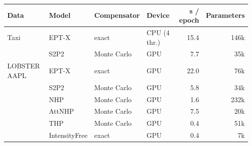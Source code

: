 \begin{tabular}{llllrr}
\toprule
Data & Model & Compensator & Device & s / epoch & Parameters \\
\midrule
\rowcolor{oursbg} Taxi & EPT-X & exact & CPU (4 thr.) & 15.4 & 146k \\
 & S2P2 & Monte Carlo & GPU & 7.7 & 35k \\
\midrule
\rowcolor{oursbg} LOBSTER AAPL & EPT-X & exact & GPU & 22.0 & 76k \\
 & S2P2 & Monte Carlo & GPU & 5.8 & 34k \\
 & NHP & Monte Carlo & GPU & 1.6 & 232k \\
 & AttNHP & Monte Carlo & GPU & 7.5 & 20k \\
 & THP & Monte Carlo & GPU & 0.4 & 51k \\
 & IntensityFree & exact & GPU & 0.4 & 7k \\
\bottomrule
\end{tabular}